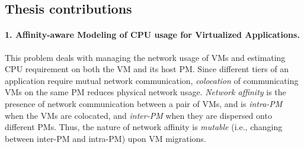 \subsection*{Thesis contributions} 
\paragraph{1. Affinity-aware Modeling of CPU usage for Virtualized Applications.} 
This problem deals with managing the network 
usage of VMs and estimating CPU 
requirement on both the VM and its host PM.
Since different tiers of an application require mutual network
communication, \textit{colocation} of communicating VMs
on the same PM reduces physical network 
usage. \textit{Network affinity} is the presence of network
communication between a pair of VMs, and is 
\textit{intra-PM} when the VMs are colocated, and 
\textit{inter-PM} when they are dispersed onto different PMs.
Thus, the nature of network affinity is \textit{mutable} (i.e., changing
between inter-PM and intra-PM) upon VM migrations.

